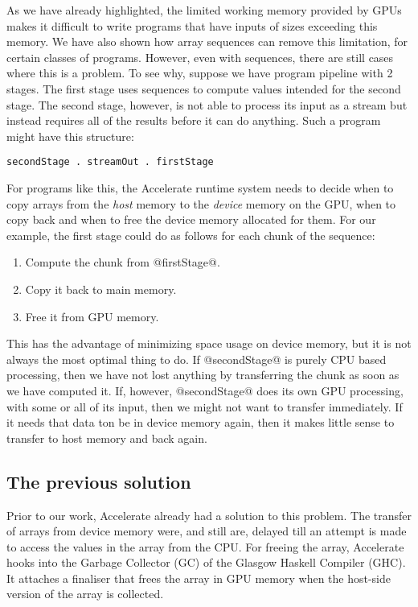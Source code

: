 As we have already highlighted, the limited working memory provided by GPUs makes it difficult to write programs that have inputs of sizes exceeding this memory. We have also shown how array sequences can remove this limitation, for certain classes of programs. However, even with sequences, there are still cases where this is a problem. To see why, suppose we have program pipeline with 2 stages. The first stage uses sequences to compute values intended for the second stage. The second stage, however, is not able to process its input as a stream but instead requires all of the results before it can do anything. Such a program might have this structure:
%
\begin{lstlisting}
secondStage . streamOut . firstStage
\end{lstlisting}

For programs like this, the Accelerate runtime system needs to decide when to copy arrays from the \emph{host} memory to the \emph{device} memory on the GPU, when to copy back and when to free the device memory allocated for them. For our example, the first stage could do as follows for each chunk of the sequence:
%
\begin{enumerate}
\item Compute the chunk from @firstStage@.
\item Copy it back to main memory.
\item Free it from GPU memory.
\end{enumerate}
%
This has the advantage of minimizing space usage on device memory, but it is not always the most optimal thing to do. If @secondStage@ is purely CPU based processing, then we have not lost anything by transferring the chunk as soon as we have computed it. If, however, @secondStage@ does its own GPU processing, with some or all of its input, then we might not want to transfer immediately. If it needs that data ton be in device memory again, then it makes little sense to transfer to host memory and back again.

\subsection{The previous solution}

Prior to our work, Accelerate already had a solution to this problem. The transfer of arrays from device memory were, and still are, delayed till an attempt is made to access the values in the array from the CPU. For freeing the array, Accelerate hooks into the Garbage Collector (GC) of the Glasgow Haskell Compiler (GHC). It attaches a finaliser that frees the array in GPU memory when the host-side version of the array is collected.

